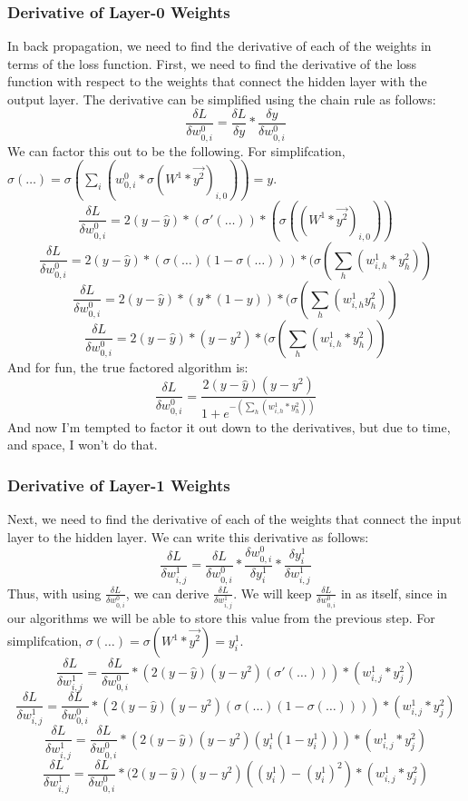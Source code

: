\documentclass[10pt]{article}
\begin{document}
\subsubsection{Derivative of Layer-0 Weights}
In back propagation, we need to find the derivative of each of the weights in terms of the loss function. First, we need to find the derivative of the loss function with respect to the weights that connect the hidden layer with the output layer. The derivative can be simplified using the chain rule as follows:
$$\frac{\delta L}{\delta w^0_{0,i}} = \frac{\delta L}{\delta y} * \frac{\delta y}{\delta w^0_{0,i}}$$
We can factor this out to be the following. 
\newline
For simplifcation, $\sigma(\ldots) = \sigma(\sum_i{(w^0_{0,i} * \sigma(W^1 * \vec{y^2})_{i,0})}) = y$.
$$\frac{\delta L}{\delta w^0_{0,i}} = 2(y - \hat{y}) * (\sigma'(\ldots)) * (\sigma((W^1 * \vec{y^2})_{i,0}))$$
$$\frac{\delta L}{\delta w^0_{0,i}} = 2(y - \hat{y}) * (\sigma(\ldots)(1 - \sigma(\ldots))) * (\sigma(\sum_h{(w^1_{i,h}* y^2_{h})})$$
$$\frac{\delta L}{\delta w^0_{0,i}} = 2(y - \hat{y}) * (y * (1 - y)) * (\sigma(\sum_h{(w^1_{i,h} y^2_{h})})$$
$$\frac{\delta L}{\delta w^0_{0,i}} = 2(y - \hat{y}) * (y - y^2) *  (\sigma(\sum_h^{}{(w^1_{i,h} *y^2_{h})})$$
And for fun, the true factored algorithm is:
$$\frac{\delta L}{\delta w^0_{0,i}} = \frac{2(y - \hat{y})(y - y^2)}{1 + e^{-(\sum_h^{}{(w^1_{i,h} *y^2_{h})})}}$$
And now I'm tempted to factor it out down to the derivatives, but due to time, and space, I won't do that.

\subsubsection{Derivative of Layer-1 Weights}
Next, we need to find the derivative of each of the weights that connect the input layer to the hidden layer. We can write this derivative as follows:
$$\frac{\delta L}{\delta w^1_{i,j}} = \frac{\delta L}{\delta w^0_{0,i}} * \frac{\delta w^0_{0,i}}{\delta y^1_i} * \frac{\delta y^1_i}{\delta w^1_{i,j}}$$
Thus, with using $\frac{\delta L}{\delta w^0_{0,i}}$, we can derive $\frac{\delta L}{\delta w^1_{i,j}}$. We will keep $\frac{\delta L}{\delta w^0_{0,i}}$ in as itself, since in our algorithms we will be able to store this value from the previous step.
\newline
For simplifcation, $\sigma(\ldots) = \sigma(W^1 * \vec{y^2}) = y^1_i$.
$$\frac{\delta L}{\delta w^1_{i,j}} = \frac{\delta L}{\delta w^0_{0,i}} * (2(y-\hat{y})(y - y^2)(\sigma'(\ldots))) * (w^1_{i,j} * y^2_{j})$$
$$\frac{\delta L}{\delta w^1_{i,j}} = \frac{\delta L}{\delta w^0_{0,i} }* (2(y - \hat{y})(y - y^2)(\sigma(\ldots)(1 - \sigma(\ldots)))) * (w^1_{i,j} * y^2_{j})$$
$$\frac{\delta L}{\delta w^1_{i,j}} = \frac{\delta L}{\delta w^0_{0,i}} * (2(y - \hat{y})(y - y^2)(y^1_i (1 - y^1_i))) * (w^1_{i,j} * y^2_{j})$$
$$\frac{\delta L}{\delta w^1_{i,j}} = \frac{\delta L}{\delta w^0_{0,i}} * (2(y - \hat{y})(y - y^2)((y^1_i) - (y^1_i)^2) * (w^1_{i,j} * y^2_{j})$$
\end{document}
